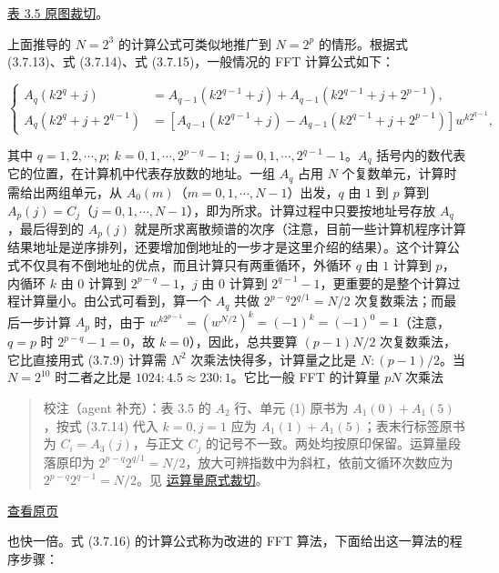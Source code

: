 \documentclass[
  10pt,
  fontset=fandol]{ctexart}
\begin{document}
\href{../assets/ch03b/table-3-5-source.png}{表 3.5 原图裁切}。

上面推导的 \(N=2^3\) 的计算公式可类似地推广到 \(N=2^p\) 的情形。根据式 (3.7.13)、式 (3.7.14)、式 (3.7.15)，一般情况的 FFT 计算公式如下：

\[
\left\{\begin{aligned}
A_q(k2^q+j)&=A_{q-1}(k2^{q-1}+j)+A_{q-1}(k2^{q-1}+j+2^{p-1}),\\
A_q(k2^q+j+2^{q-1})&=[A_{q-1}(k2^{q-1}+j)-A_{q-1}(k2^{q-1}+j+2^{p-1})]w^{k2^{q-1}},
\end{aligned}\right.\tag{3.7.16}
\]

其中 \(q=1,\allowbreak 2,\allowbreak \cdots,\allowbreak p;\ k=0,\allowbreak 1,\allowbreak \cdots,\allowbreak 2^{p-q}-1;\ j=0,\allowbreak 1,\allowbreak \cdots,\allowbreak 2^{q-1}-1\)。\(A_q\) 括号内的数代表它的位置，在计算机中代表存放数的地址。一组 \(A_q\) 占用 \(N\) 个复数单元，计算时需给出两组单元，从 \(A_0(m)\)（\(m=0,1,\cdots,N-1\)）出发，\(q\) 由 \(1\) 到 \(p\) 算到 \(A_p(j)=C_j\)（\(j=0,1,\cdots,N-1\)），即为所求。计算过程中只要按地址号存放 \(A_q\)，最后得到的 \(A_p(j)\) 就是所求离散频谱的次序（注意，目前一些计算机程序计算结果地址是逆序排列，还要增加倒地址的一步才是这里介绍的结果）。这个计算公式不仅具有不倒地址的优点，而且计算只有两重循环，外循环 \(q\) 由 \(1\) 计算到 \(p\)，内循环 \(k\) 由 \(0\) 计算到 \(2^{p-q}-1\)，\(j\) 由 \(0\) 计算到 \(2^{q-1}-1\)，更重要的是整个计算过程计算量小。由公式可看到，算一个 \(A_q\) 共做 \(2^{p-q}2^{q/1}=N/2\) 次复数乘法；而最后一步计算 \(A_p\) 时，由于 \(w^{k2^{p-1}}=(w^{N/2})^k=(-1)^k=(-1)^0=1\)（注意，\(q=p\) 时 \(2^{p-q}-1=0\)，故 \(k=0\)），因此，总共要算 \((p-1)N/2\) 次复数乘法，它比直接用式 (3.7.9) 计算需 \(N^2\) 次乘法快得多，计算量之比是 \(N:(p-1)/2\)。当 \(N=2^{10}\) 时二者之比是 \(1024:4.5\approx230:1\)。它比一般 FFT 的计算量 \(pN\) 次乘法

\begin{quote}
校注（agent 补充）：表 3.5 的 \(A_2\) 行、单元 (1) 原书为 \(A_1(0)+A_1(5)\)，按式 (3.7.14) 代入 \(k=0,j=1\) 应为 \(A_1(1)+A_1(5)\)；表末行标签原书为 \(C_i=A_3(j)\)，与正文 \(C_j\) 的记号不一致。两处均按原印保留。运算量段落原印为 \(2^{p-q}2^{q/1}=N/2\)，放大可辨指数中为斜杠，依前文循环次数应为 \(2^{p-q}2^{q-1}=N/2\)。见 \href{../assets/ch03b/p089-operation-count.png}{运算量原式裁切}。
\end{quote}

\href{../../source-images/pdf-090.jpeg}{查看原页}

也快一倍。式 (3.7.16) 的计算公式称为改进的 FFT 算法，下面给出这一算法的程序步骤：
\end{document}
